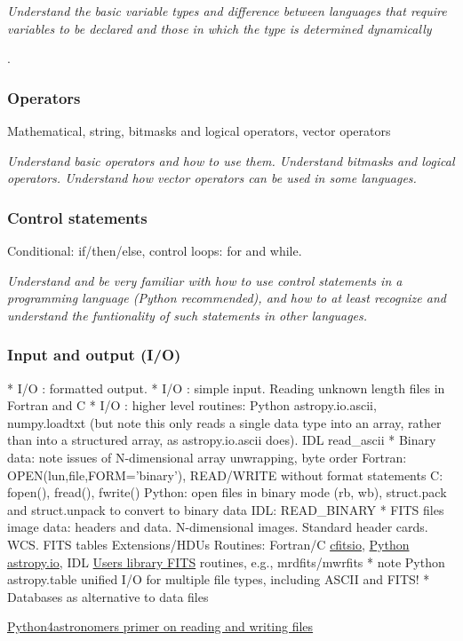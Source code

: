 \documentclass{article}
\newcommand{\test}[1]{%
    \begin{center}
        \colorbox{hl}{\parbox{0.9\textwidth}{\emph{#1}}}
    \end{center}}
\begin{document}
\test{Understand the basic variable types and difference between
languages that require variables to be declared and those in which the
type is determined dynamically}.

\subsubsection{Operators}
Mathematical, string, bitmasks and logical operators, vector operators
\test{Understand basic operators and how to use them. Understand
bitmasks and logical operators. Understand how vector operators can be
used in some languages.}
\subsubsection{Control statements}
Conditional: if/then/else, control loops: for and while.

\test{Understand and be very familiar with how to use control
statements in a programming language (Python recommended),
and how to at least recognize and understand the funtionality
of such statements in other languages.}
\subsubsection{Input and output (I/O)}

* I/O : formatted output.
* I/O : simple input. Reading unknown length files in Fortran and C
* I/O : higher level routines: Python astropy.io.ascii, numpy.loadtxt
(but note this only reads a single data type into an array, rather
than into a structured array, as astropy.io.ascii does). IDL
read\_ascii
* Binary data: note issues of N-dimensional array unwrapping, byte order
Fortran: OPEN(lun,file,FORM='binary'), READ/WRITE without format
statements
C: fopen(), fread(), fwrite()
Python: open files in binary mode (rb, wb), struct.pack and
struct.unpack to convert to binary data
IDL: READ\_BINARY
* FITS files
image data: headers and data. N-dimensional images. Standard header
cards. WCS.
FITS tables
Extensions/HDUs
Routines: Fortran/C
\href{http://heasarc.gsfc.nasa.gov/fitsio/fitsio.html}
{cfitsio},
\href{http://astropy.readthedocs.io/en/latest/io/fits/index.html}
{Python astropy.io}, IDL
\href{http://idlastro.gsfc.nasa.gov/contents.html#C9}
{Users library FITS}
routines, e.g., mrdfits/mwrfits
* note Python astropy.table unified I/O for multiple file types,
including ASCII and FITS!
* Databases as alternative to data files

\href{https://python4astronomers.github.io/files/files.html}
{Python4astronomers primer on reading and writing files}
\end{document}
